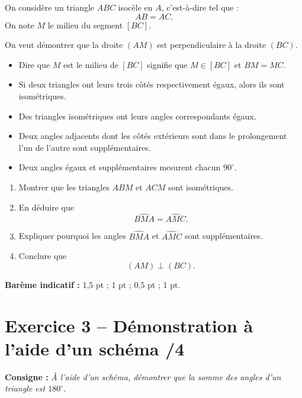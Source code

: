\documentclass[11pt,a4paper]{article}
\begin{document}
On considère un triangle \(ABC\) isocèle en \(A\), c'est-à-dire tel que :
\[
AB=AC.
\]
On note \(M\) le milieu du segment \([BC]\).

On veut démontrer que la droite \((AM)\) est perpendiculaire à la droite \((BC)\).

\begin{tcolorbox}[title=Rappels utiles]
\begin{itemize}[leftmargin=1.2cm]
    \item Dire que \(M\) est le milieu de \([BC]\) signifie que \(M \in [BC]\) et \(BM=MC\).
    \item Si deux triangles ont leurs trois côtés respectivement égaux, alors ils sont isométriques.
    \item Des triangles isométriques ont leurs angles correspondants égaux.
    \item Deux angles adjacents dont les côtés extérieurs sont dans le prolongement l'un de l'autre sont supplémentaires.
    \item Deux angles égaux et supplémentaires mesurent chacun \(90^\circ\).
\end{itemize}
\end{tcolorbox}

\begin{enumerate}[label=\textbf{\arabic*.}, leftmargin=1.2cm]
    \item Montrer que les triangles \(ABM\) et \(ACM\) sont isométriques.
    \item En déduire que
    \[
    \widehat{BMA}=\widehat{AMC}.
    \]
    \item Expliquer pourquoi les angles \(\widehat{BMA}\) et \(\widehat{AMC}\) sont supplémentaires.
    \item Conclure que
    \[
    (AM)\perp(BC).
    \]
\end{enumerate}

\vspace{0.6em}
\textbf{Barème indicatif :} 1,5 pt ; 1 pt ; 0,5 pt ; 1 pt.

\section*{Exercice 3 -- Démonstration à l'aide d'un schéma \hfill /4}

\textbf{Consigne :} \emph{À l'aide d'un schéma, démontrer que la somme des angles d'un triangle est \(180^\circ\).}

\medskip
\end{document}

